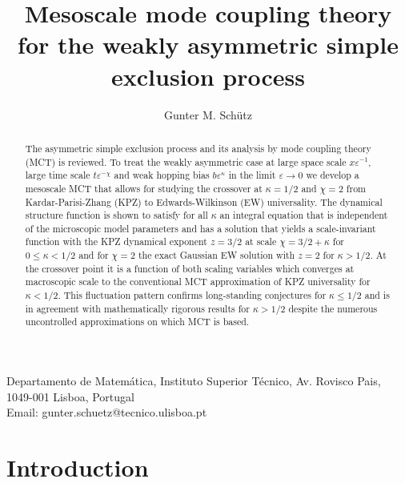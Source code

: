 \documentclass[12pt]{article}
\begin{document}
\title{Mesoscale mode coupling theory for the weakly asymmetric simple exclusion process}
\author{Gunter M. Sch\"utz}
\maketitle

{\small 
Departamento de Matemática,
Instituto Superior Técnico,
Av. Rovisco Pais,
1049-001 Lisboa,
Portugal
\\
\noindent Email: gunter.schuetz@tecnico.ulisboa.pt
%
}

\begin{abstract}
The asymmetric simple exclusion process and its analysis by 
mode coupling theory (MCT) is reviewed. To treat the weakly 
asymmetric case at large space scale $x\varepsilon^{-1}$, 
large time scale $t \varepsilon^{-\chi}$ and weak hopping bias $b 
\varepsilon^{\kappa}$ in the limit $\varepsilon \to 0$ we develop a 
mesoscale MCT that allows for studying the crossover at $\kappa=1/2$ 
and $\chi=2$ from Kardar-Parisi-Zhang (KPZ) to Edwards-Wilkinson 
(EW) universality. The dynamical structure function is shown to satisfy
for all $\kappa$ an integral equation that is independent of 
the microscopic model parameters and has a solution that yields a 
scale-invariant function with the KPZ dynamical exponent $z=3/2$
at scale $\chi=3/2+\kappa$ for $0\leq\kappa<1/2$ and for $\chi=2$
the exact Gaussian EW solution with $z=2$ for $\kappa>1/2$. 
At the crossover point it is a function of both scaling variables which 
converges at macroscopic scale to the conventional MCT approximation 
of KPZ universality for $\kappa<1/2$. This fluctuation pattern 
confirms long-standing conjectures for $\kappa \leq 1/2$
and is in agreement with mathematically rigorous results 
for $\kappa>1/2$ despite the
numerous uncontrolled approximations on which MCT is based.
\end{abstract}



\section{Introduction}
\label{sec:1}
\end{document}
